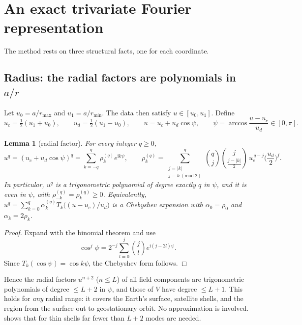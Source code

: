 \documentclass[11pt,a4paper]{article}
\newtheorem{lemma}{Lemma}
\theoremstyle{remark}
\begin{document}
\section{An exact trivariate Fourier representation}\label{sec:representation}

The method rests on three structural facts, one for each coordinate.

\subsection{Radius: the radial factors are polynomials in \texorpdfstring{$a/r$}{a/r}}\label{sec:radial-exact}

Let $u_0=a/r_{\max}$ and $u_1=a/r_{\min}$. The data then satisfy $u\in[u_0,u_1]$. Define
\begin{equation}\label{eq:psi}
u_c=\tfrac12(u_1+u_0),\qquad u_d=\tfrac12(u_1-u_0),\qquad
u=u_c+u_d\cos\psi,\qquad \psi=\arccos\frac{u-u_c}{u_d}\in[0,\pi].
\end{equation}

\begin{lemma}[radial factor]\label{lem:radial}
For every integer $q\ge0$,
\begin{equation}\label{eq:rho}
u^{q}=(u_c+u_d\cos\psi)^q=\sum_{k=-q}^{q}\rho_k^{(q)}e^{\mathrm ik\psi},\qquad
\rho_k^{(q)}=\sum_{\substack{j=|k|\\ j\equiv k\ (\mathrm{mod}\ 2)}}^{q}\binom qj\binom{j}{\frac{j-|k|}2}\,u_c^{\,q-j}\Big(\frac{u_d}2\Big)^{j}.
\end{equation}
In particular, $u^q$ is a trigonometric polynomial of degree exactly $q$ in $\psi$, and it is
even in $\psi$, with $\rho^{(q)}_{-k}=\rho^{(q)}_k\ge0$. Equivalently,
$u^q=\sum_{k=0}^q\alpha_k^{(q)}T_k\big((u-u_c)/u_d\big)$ is a Chebyshev expansion with
$\alpha_0=\rho_0$ and $\alpha_k=2\rho_k$.
\end{lemma}
\begin{proof}
Expand with the binomial theorem and use
\[\cos^j\psi=2^{-j}\sum_{l=0}^{j}\binom jl e^{\mathrm i(j-2l)\psi}.\]
Since $T_k(\cos\psi)=\cos k\psi$, the Chebyshev form follows.
\end{proof}

Hence the radial factors $u^{n+2}$ ($n\le L$) of all field components are trigonometric
polynomials of degree $\le L+2$ in $\psi$, and those of $V$ have degree $\le L+1$. This holds for
\emph{any} radial range: it covers the Earth's surface, satellite shells, and the region from the
surface out to geostationary orbit. No approximation is involved.  shows that for thin shells
far fewer than $L+2$ modes are needed.
\end{document}

